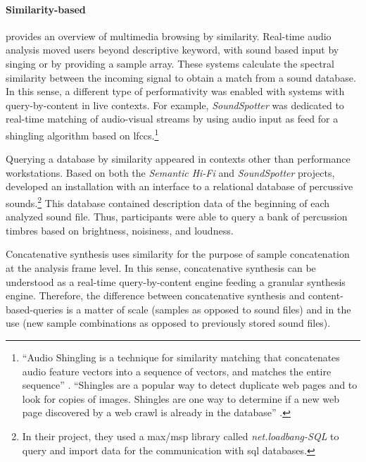 \documentclass[
]{book}
\begin{document}
\paragraph{Similarity-based}
\textcite{Frisson2015} provides an overview of multimedia browsing by similarity. Real-time audio analysis moved users beyond descriptive keyword, with sound based input by singing or by providing a sample array. These systems calculate the spectral similarity between the incoming signal to obtain a match from a sound database. In this sense, a different type of performativity was enabled with systems with query-by-content in live contexts. For example, \textit{SoundSpotter} \parencite{DBLP:conf/icmc/CaseyG07} was dedicated to real-time matching of audio-visual streams by using audio input as feed for a shingling algorithm based on \glspl{lfcc}.\footnote{``Audio Shingling is a technique for similarity matching that concatenates audio feature vectors into a sequence of vectors, and matches the entire sequence'' \parencite{DBLP:conf/icmc/CaseyG07}. ``Shingles are a popular way to detect duplicate web pages and to look for copies of images. Shingles are one way to determine if a new web page discovered by a web crawl is already in the database'' \parencite{DBLP:conf/ismir/CaseyS06}.}

Querying a database by similarity appeared in contexts other than performance workstations. Based on both the \textit{Semantic Hi-Fi} and \textit{SoundSpotter} projects, \textcite{Price2008} developed an installation with an interface to a relational database of percussive sounds.\footnote{In their project, they used a \gls{max/msp} library called \textit{net.loadbang-SQL} to query and import data for the communication with \gls{sql} databases.} This database contained description data of the beginning of each analyzed sound file. Thus, participants were able to query a bank of percussion timbres based on brightness, noisiness, and loudness. 

Concatenative synthesis uses similarity for the purpose of sample concatenation at the analysis frame level. In this sense, concatenative synthesis can be understood as a real-time query-by-content engine feeding a granular synthesis engine. Therefore, the difference between concatenative synthesis and content-based-queries is a matter of scale (samples as opposed to sound files) and in the use (new sample combinations as opposed to previously stored sound files). 
\end{document}
